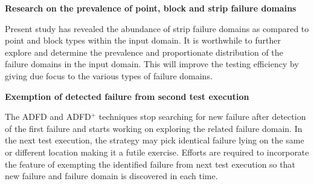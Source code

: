 \textbf{Research on the prevalence of point, block and strip failure domains}

Present study has revealed the abundance of strip failure domains as compared to point and block types within the input domain. It is worthwhile to further explore and determine the prevalence and proportionate distribution of the failure domains in the input domain. This will improve the testing efficiency by giving due focus to the various types of failure domains.



\textbf{Exemption of detected failure from second test execution}



The ADFD and ADFD$^+$ techniques stop searching for new failure after detection of the first failure and starts working on exploring the related failure domain. In the next test execution, the strategy may pick identical failure lying on the same or different location making it a futile exercise. Efforts are required to incorporate the feature of exempting the identified failure from next test execution so that new failure and failure domain is discovered in each time.\\






